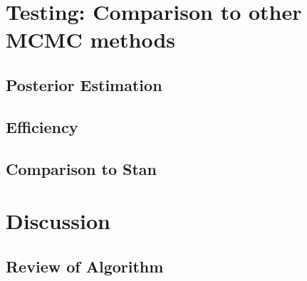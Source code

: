 \documentclass[12pt]{article}
\begin{document}
\section{Testing: Comparison to other MCMC methods}
\subsection{Posterior Estimation} 
\subsection{Efficiency}
\subsection{Comparison to Stan}

\section{Discussion}
\subsection{Review of Algorithm}

\newpage

\end{document}

